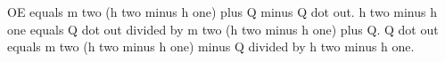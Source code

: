 OE equals m two (h two minus h one) plus Q minus Q dot out.  
h two minus h one equals Q dot out divided by m two (h two minus h one) plus Q.  
Q dot out equals m two (h two minus h one) minus Q divided by h two minus h one.
